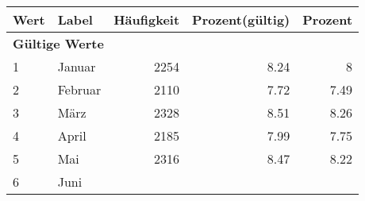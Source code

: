      \begin{longtable}{lXrrr}
     \toprule
     \textbf{Wert} & \textbf{Label} & \textbf{Häufigkeit} & \textbf{Prozent(gültig)} & \textbf{Prozent} \\
     \endhead
     \midrule
     \multicolumn{5}{l}{\textbf{Gültige Werte}}\\

     1 &
     \multicolumn{1}{X}{ Januar   } &


       \num{2254} &
       \num[round-mode=places,round-precision=2]{8.24} &
         \num[round-mode=places,round-precision=2]{8} \\

     2 &
     \multicolumn{1}{X}{ Februar   } &


       \num{2110} &
       \num[round-mode=places,round-precision=2]{7.72} &
         \num[round-mode=places,round-precision=2]{7.49} \\

     3 &
     \multicolumn{1}{X}{ März   } &


       \num{2328} &
       \num[round-mode=places,round-precision=2]{8.51} &
         \num[round-mode=places,round-precision=2]{8.26} \\

     4 &
     \multicolumn{1}{X}{ April   } &


       \num{2185} &
       \num[round-mode=places,round-precision=2]{7.99} &
         \num[round-mode=places,round-precision=2]{7.75} \\

     5 &
     \multicolumn{1}{X}{ Mai   } &


       \num{2316} &
       \num[round-mode=places,round-precision=2]{8.47} &
         \num[round-mode=places,round-precision=2]{8.22} \\

     6 &
     \multicolumn{1}{X}{ Juni   } &



\end{longtable}
